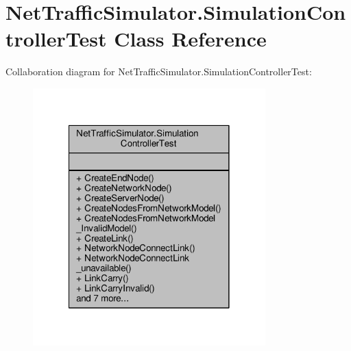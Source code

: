 \hypertarget{classNetTrafficSimulator_1_1SimulationControllerTest}{\section{Net\-Traffic\-Simulator.\-Simulation\-Controller\-Test Class Reference}
\label{classNetTrafficSimulator_1_1SimulationControllerTest}
}


Collaboration diagram for Net\-Traffic\-Simulator.\-Simulation\-Controller\-Test\-:
\nopagebreak
\begin{figure}[H]
\begin{center}
\leavevmode
\includegraphics[width=254pt]{classNetTrafficSimulator_1_1SimulationControllerTest__coll__graph}
\end{center}
\end{figure}
